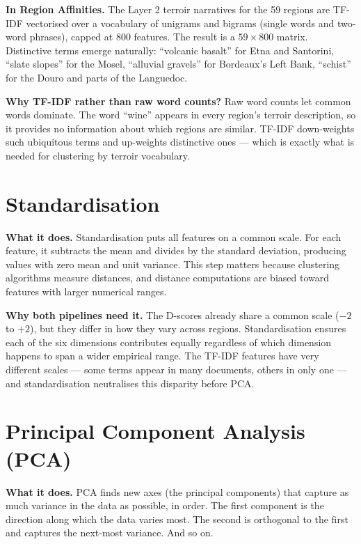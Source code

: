 \documentclass[11pt]{article}
\begin{document}
\textbf{In Region Affinities.} The Layer 2 terroir narratives for the 59 regions are TF-IDF vectorised over a vocabulary of unigrams and bigrams (single words and two-word phrases), capped at 800 features. The result is a $59 \times 800$ matrix. Distinctive terms emerge naturally: ``volcanic basalt'' for Etna and Santorini, ``slate slopes'' for the Mosel, ``alluvial gravels'' for Bordeaux's Left Bank, ``schist'' for the Douro and parts of the Languedoc.

\textbf{Why TF-IDF rather than raw word counts?} Raw word counts let common words dominate. The word ``wine'' appears in every region's terroir description, so it provides no information about which regions are similar. TF-IDF down-weights such ubiquitous terms and up-weights distinctive ones --- which is exactly what is needed for clustering by terroir vocabulary.

\section{Standardisation}

\textbf{What it does.} Standardisation puts all features on a common scale. For each feature, it subtracts the mean and divides by the standard deviation, producing values with zero mean and unit variance. This step matters because clustering algorithms measure distances, and distance computations are biased toward features with larger numerical ranges.

\textbf{Why both pipelines need it.} The D-scores already share a common scale ($-2$ to $+2$), but they differ in how they vary across regions. Standardisation ensures each of the six dimensions contributes equally regardless of which dimension happens to span a wider empirical range. The TF-IDF features have very different scales --- some terms appear in many documents, others in only one --- and standardisation neutralises this disparity before PCA.

\section{Principal Component Analysis (PCA)}

\textbf{What it does.} PCA finds new axes (the principal components) that capture as much variance in the data as possible, in order. The first component is the direction along which the data varies most. The second is orthogonal to the first and captures the next-most variance. And so on.
\end{document}
